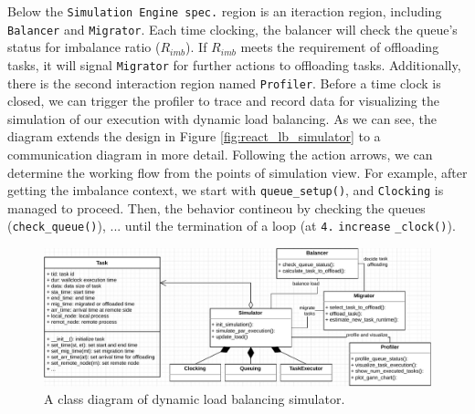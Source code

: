 Below the \texttt{Simulation Engine spec.} region is an iteraction region, including \texttt{Balancer} and \texttt{Migrator}. Each time clocking, the balancer will check the queue's status for imbalance ratio ($R_{imb}$). If $R_{imb}$ meets the requirement of offloading tasks, it will signal \texttt{Migrator} for further actions to offloading tasks. Additionally, there is the second interaction region named \texttt{Profiler}. Before a time clock is closed, we can trigger the profiler to trace and record data for visualizing the simulation of our execution with dynamic load balancing. As we can see, the diagram extends the design in Figure \ref{fig:react_lb_simulator} to a communication diagram in more detail. Following the action arrows, we can determine the working flow from the points of simulation view. For example, after getting the imbalance context, we start with \texttt{queue\_setup()}, and \texttt{Clocking} is managed to proceed. Then, the behavior contineou by checking the queues (\texttt{check\_queue()}), ... until the termination of a loop (at \texttt{4.} \texttt{increase} \texttt{\_clock()}).\\

\begin{figure}[t]
  \centering
  \includegraphics[scale=0.65]{./pictures/poc_implementation/poc_simulator_class_diagram.pdf}
	\caption{A class diagram of dynamic load balancing simulator.}
	\label{fig:simulator_class_diagram}
\end{figure}

